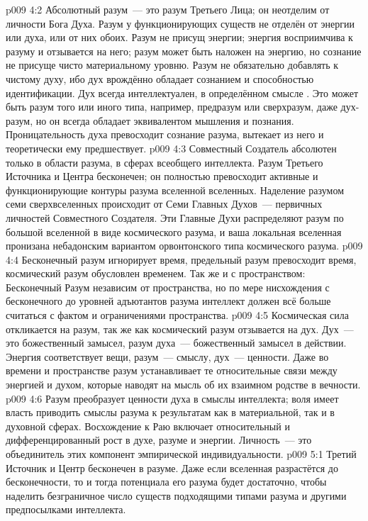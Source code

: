\vs p009 4:2 Абсолютный разум~--- это разум Третьего Лица; он неотделим от личности Бога Духа. Разум у функционирующих существ не отделён от энергии или духа, или от них обоих. Разум не присущ энергии; энергия восприимчива к разуму и отзывается на него; разум может быть наложен на энергию, но сознание не присуще чисто материальному уровню. Разум не обязательно добавлять к чистому духу, ибо дух врождённо обладает сознанием и способностью идентификации. Дух всегда интеллектуален, в определённом смысле . Это может быть разум того или иного типа, например, предразум или сверхразум, даже дух\hyp{}разум, но он всегда обладает эквивалентом мышления и познания. Проницательность духа превосходит сознание разума, вытекает из него и теоретически ему предшествует.
\vs p009 4:3 \pc Совместный Создатель абсолютен только в области разума, в сферах всеобщего интеллекта. Разум Третьего Источника и Центра бесконечен; он полностью превосходит активные и функционирующие контуры разума вселенной вселенных. Наделение разумом семи сверхвселенных происходит от Семи Главных Духов~--- первичных личностей Совместного Создателя. Эти Главные Духи распределяют разум по большой вселенной в виде космического разума, и ваша локальная вселенная пронизана небадонским вариантом орвонтонского типа космического разума.
\vs p009 4:4 Бесконечный разум игнорирует время, предельный разум превосходит время, космический разум обусловлен временем. Так же и с пространством: Бесконечный Разум независим от пространства, но по мере нисхождения с бесконечного до уровней адъютантов разума интеллект должен всё больше считаться с фактом и ограничениями пространства.
\vs p009 4:5 \pc Космическая сила откликается на разум, так же как космический разум отзывается на дух. Дух~--- это божественный замысел, разум духа~--- божественный замысел в действии. Энергия соответствует вещи, разум~--- смыслу, дух~--- ценности. Даже во времени и пространстве разум устанавливает те относительные связи между энергией и духом, которые наводят на мысль об их взаимном родстве в вечности.
\vs p009 4:6 Разум преобразует ценности духа в смыслы интеллекта; воля имеет власть приводить смыслы разума к результатам как в материальной, так и в духовной сферах. Восхождение к Раю включает относительный и дифференцированный рост в духе, разуме и энергии. Личность~--- это объединитель этих компонент эмпирической индивидуальности.
\vs p009 5:1 Третий Источник и Центр бесконечен в разуме. Даже если вселенная разрастётся до бесконечности, то и тогда потенциала его разума будет достаточно, чтобы наделить безграничное число существ подходящими типами разума и другими предпосылками интеллекта.

